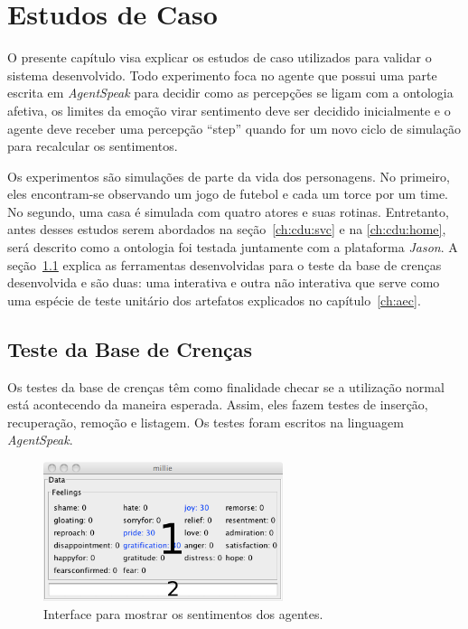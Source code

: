 \chapter{Estudos de Caso} \label{ch:cdu}

O presente capítulo visa explicar os estudos de caso utilizados para validar o
sistema desenvolvido. Todo experimento foca no agente que possui uma parte escrita em
\emph{AgentSpeak} para decidir como as percepções se ligam com a ontologia
afetiva, os limites da emoção virar sentimento deve ser decidido inicialmente
e o agente deve receber uma percepção ``step'' quando for um novo ciclo de
simulação para recalcular os sentimentos.

Os experimentos são simulações de parte da vida dos personagens. No primeiro, eles
encontram-se observando um jogo de futebol e cada um torce por um time. No
segundo, uma casa é simulada com quatro atores e suas rotinas. Entretanto,
antes desses estudos serem abordados na seção~\ref{ch:cdu:svc} e na
\ref{ch:cdu:home}, será descrito como a ontologia foi testada juntamente com a
plataforma \emph{Jason}. A seção~\ref{ch:cdu:tbc} explica as ferramentas
desenvolvidas para o teste da base de crenças desenvolvida e são duas: uma
interativa e outra não interativa que serve como uma espécie de teste unitário
dos artefatos explicados no capítulo~\ref{ch:aec}.

\section{Teste da Base de Crenças} \label{ch:cdu:tbc}

Os testes da base de crenças têm como finalidade checar se a utilização normal
está acontecendo da maneira esperada. Assim, eles fazem testes de inserção,
recuperação, remoção e listagem. Os testes foram escritos na linguagem
\emph{AgentSpeak}.

\begin{figure}
	\begin{center}
		\includegraphics[width=70mm]{figuras/introductionDF.png}
	\end{center}
	\caption{Interface para mostrar os sentimentos dos agentes.}
	\label{fig:introducaoDF}
\end{figure}


